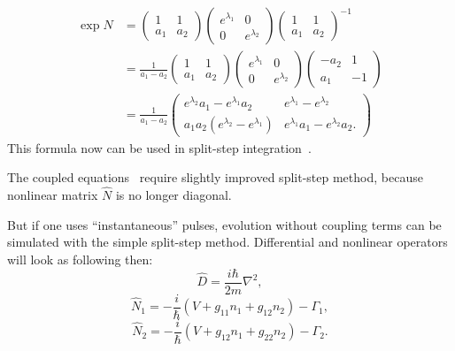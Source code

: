 \begin{equation}
\begin{split}
    \exp \hat{N} & = \begin{pmatrix}
        1 & 1 \\ a_1 & a_2
    \end{pmatrix}
    \begin{pmatrix}
        e^{\lambda_1} & 0 \\ 0 & e^{\lambda_2}
    \end{pmatrix}
    \begin{pmatrix}
        1 & 1 \\ a_1 & a_2
    \end{pmatrix}^{-1} \\
    & = \frac{1}{a_1 - a_2}
    \begin{pmatrix}
        1 & 1 \\ a_1 & a_2
    \end{pmatrix}
    \begin{pmatrix}
        e^{\lambda_1} & 0 \\ 0 & e^{\lambda_2}
    \end{pmatrix}
    \begin{pmatrix}
        -a_2 & 1 \\ a_1 & -1
    \end{pmatrix} \\
    & = \frac{1}{a_1 - a_2}
    \begin{pmatrix}
        e^{\lambda_2} a_1 - e^{\lambda_1} a_2 &
        e^{\lambda_1} - e^{\lambda_2} \\
        a_1 a_2 (e^{\lambda_2} - e^{\lambda_1}) &
        e^{\lambda_1} a_1 - e^{\lambda_2} a_2.
    \end{pmatrix}
\end{split}
\end{equation}
This formula now can be used in split-step integration~.

The coupled equations~ require slightly improved split-step method, because nonlinear matrix $\hat{N}$ is no longer diagonal.

But if one uses ``instantaneous'' pulses, evolution without coupling terms can be simulated with the simple split-step method.
Differential and nonlinear operators will look as following then:
\[
    \hat{D} = \frac{i \hbar}{2m} \nabla^2,
\]
\[
    \hat{N}_1 = -\frac{i}{\hbar} \left( V + g_{11} n_1 + g_{12} n_2 \right) - \Gamma_1,
\]
\[
    \hat{N}_2 = -\frac{i}{\hbar} \left( V + g_{12} n_1 + g_{22} n_2 \right) - \Gamma_2.
\]


